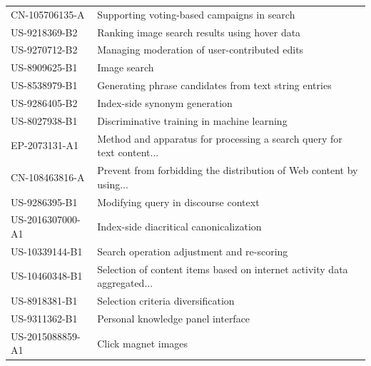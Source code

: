\begin{table}[]
\begin{tabular}{ll}
CN-105706135-A   & Supporting voting-based campaigns in search                                                                     \\
US-9218369-B2    & Ranking image search results using hover data                                                                   \\
US-9270712-B2    & Managing moderation of user-contributed edits                                                                   \\
US-8909625-B1    & Image search                                                                                                    \\
US-8538979-B1    & Generating phrase candidates from text string entries                                                           \\
US-9286405-B2    & Index-side synonym generation                                                                                   \\
US-8027938-B1    & Discriminative training in machine learning                                                                     \\
EP-2073131-A1    & Method and apparatus for processing a search query for text content...                                       \\
CN-108463816-A   & Prevent from forbidding the distribution of Web content by using...                    \\
US-9286395-B1    & Modifying query in discourse context                                                                            \\
US-2016307000-A1 & Index-side diacritical canonicalization                                                                         \\
US-10339144-B1   & Search operation adjustment and re-scoring                                                                      \\
US-10460348-B1   & Selection of content items based on internet activity data aggregated...           \\
US-8918381-B1    & Selection criteria diversification                                                                              \\
US-9311362-B1    & Personal knowledge panel interface                                                                              \\
US-2015088859-A1 & Click magnet images                                                                                             \\

\end{tabular}
\end{table}
